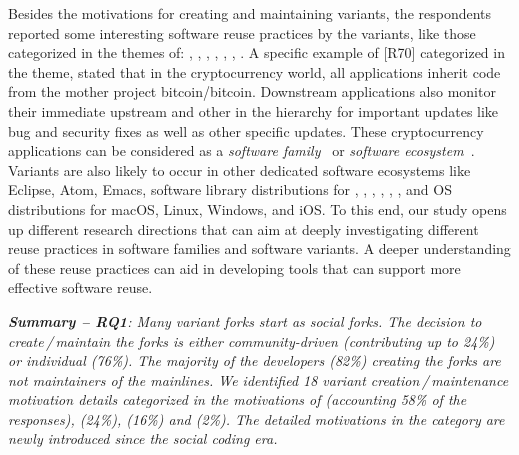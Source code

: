 Besides the motivations for creating and maintaining variants, the respondents reported some interesting software reuse practices by the variants, like those categorized in the themes of: , , , , , , . A specific example of [R70] categorized in the  theme, stated that in the cryptocurrency world, all applications inherit code from the mother project \textsf{bitcoin/bitcoin}. Downstream applications also monitor their immediate upstream and other in the hierarchy for important updates like bug and security fixes as well as other specific updates. These cryptocurrency applications can be considered as a \textit{software family}~\cite{businge:2018icsme} or \textit{software ecosystem}~\cite{Decan:2019:emse}. %
Variants are also likely to occur in other dedicated software ecosystems like \textsf{Eclipse}, \textsf{Atom}, \textsf{Emacs}, software library distributions for  \java, \cp, \cpp, \py, \go, \rb, and OS distributions for \textsf{macOS}, \textsf{Linux}, \textsf{Windows}, and \textsf{iOS}.
To this end, our study opens up different research directions that can aim at deeply investigating different reuse practices in software families and software variants. A deeper understanding of these reuse practices can aid in developing tools that can support more effective software reuse.

\begin{custombox}
\emph{\textbf{Summary -- RQ1}:
Many variant forks start as social forks. The decision to create\,/\,maintain the forks is either community-driven (contributing up to 24\%) or individual (76\%). The majority  of the developers (82\%) creating the forks are not maintainers of the mainlines. We  identified 18 variant creation\,/\,maintenance motivation details categorized in the motivations of  (accounting 58\% of the responses),  (24\%),  (16\%) and  (2\%). The detailed motivations in the  category are newly introduced since the social coding era.
}
\end{custombox}


